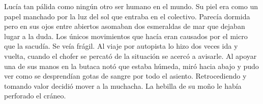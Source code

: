 Lucía tan pálida como ningún otro ser humano en el mundo. Su piel era como
un papel manchado por la luz del sol que entraba en el colectivo. Parecía dormida
pero en sus ojos entre abiertos asomaban dos esmeraldas de mar que dejaban 
lugar a la duda. Los únicos movimientos que hacía eran causados por el micro
que la sacudía. Se veía frágil. Al viaje por autopista lo hizo dos veces ida y vuelta,
cuando el chofer se percató de la situación se acercó a avisarle. Al apoyar una de
sus manos en la butaca notó que estaba húmeda, miró hacia abajo y pudo ver como
se desprendían gotas de sangre por todo el asiento. Retrocediendo y tomando valor
decidió mover a la muchacha. La hebilla de su moño le había perforado el cráneo.
